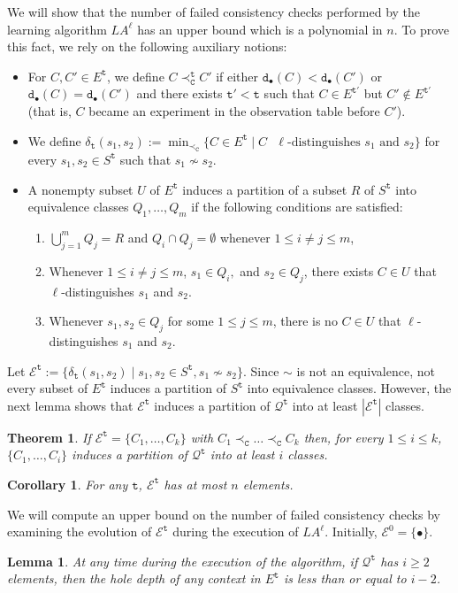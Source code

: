 \documentclass[preprint,12pt,english]{article}
\def\hole{\bullet}
\def\cE{\mathcal{E}}
\def\cQ{\mathcal{Q}}
\def\depth{\mathtt{d}}
\def\ty{\mathtt{t}}
\newtheorem{lemma}{Lemma}
\newtheorem{corollary}{Corollary}
\newtheorem{theorem}{Theorem}
\begin{document}
We will show that the number of failed consistency checks performed by the learning algorithm $LA^\ell$ has an upper bound which is a polynomial in $n$. 
 To prove this fact, we  rely on the following auxiliary notions:
\begin{itemize}
\item For $C,C'\in E^\ty$, we define $C\prec^\ty_{\mathtt{C}} C'$ if either $\depth_\hole(C)<\depth_\hole(C')$ or $\depth_\hole(C)=\depth_\hole(C')$ and there exists $\ty'<\ty$ such that $C\in E^{\ty'}$ but $C'\not\in E^{\ty'}$ (that is, $C$ became an experiment in the observation table before $C'$).
\item We define 
$\delta_{\ty}(s_1,s_2):=\min_{\prec_{\mathtt{C}}}\{C\in E^{\ty}\mid C\text{ $\ell$-distinguishes $s_1$ and $s_2$}\}$
for every $s_1,s_2\in S^{\ty}$ such that $s_1\nsim s_2$.
\item A nonempty subset $U$ of $E^{\ty}$ induces a partition of a subset $R$ of $S^{\ty}$ into equivalence classes $Q_1,\ldots,Q_m$ if the following conditions are satisfied:
\begin{enumerate}
\item $\bigcup_{j=1}^m Q_j=R$ and $Q_i\cap Q_j=\emptyset$ whenever $1\leq i\neq j\leq m$,
\item Whenever $1\leq i\neq j\leq m$, $s_1\in Q_i,$ and $s_2\in Q_j$, there exists $C\in U$ that $\ell$-distinguishes $s_1$ and $s_2$.
\item Whenever $s_1,s_2\in Q_j$ for some $1\leq j\leq m$, there is no $C\in U$ that $\ell$-distinguishes $s_1$ and $s_2$.
\end{enumerate}
\end{itemize}
Let $\cE^{\ty}:=\{\delta_{\ty}(s_1,s_2)\mid s_1,s_2\in S^{\ty},s_1\nsim s_2\}$. 
Since $\sim$ is not an equivalence, not every subset of $E^{\ty}$ induces a partition of $S^\ty$ into equivalence classes. However, the next lemma shows that $\cE^{\ty}$  induces a partition of $\cQ^{\ty}$ into at least $|\cE^{\ty}|$ classes.
\begin{theorem}
\label{conscheck}
If $\cE^{\ty}=\{C_1,\ldots,C_k\}$ with $C_1\prec_{\mathtt{C}}\ldots\prec_{\mathtt{C}} C_k$ then, for every $1\leq i\leq k$,  $\{C_1,\ldots,C_i\}$ induces a partition of $\cQ^\ty$ into at least $i$ classes.
\end{theorem}
 \begin{corollary}
 \label{cor5}
 For any $\ty$, $\cE^\ty$ has at most $n$ elements.
 \end{corollary}
We will compute an upper bound on the number of failed consistency checks by examining the evolution of $\cE^{\ty}$ during the execution of  $LA^\ell.$ Initially, $\cE^0=\{\hole\}.$ 
 \begin{lemma}
\label{tmy4}
At any time during the execution of the algorithm, if $\cQ^\ty$ has $i\geq 2$ elements, then the hole depth of any context in $E^\ty$ is less than or equal to $i-2$.
\end{lemma}
\end{document}
